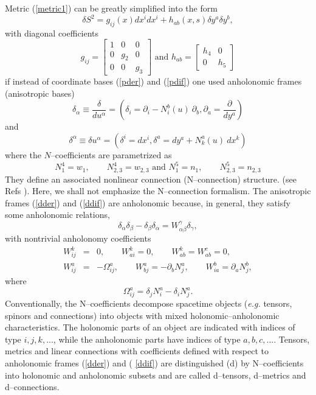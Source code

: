 \documentclass[a4paper,preprint,prabib,aps]{revtex4}
\begin{document}
Metric (\ref{metric1}) can be greatly simplified into the form
\begin{equation}
\delta S^{2}=g_{ij}\left( x\right) dx^{i}dx^{i}+h_{ab}\left( x,s\right)
\delta y^{a}\delta y^{b},  \label{dmetric}
\end{equation}
with diagonal coefficients
\begin{equation}
g_{ij}=\left[
\begin{array}{lll}
1 & 0 & 0 \\
0 & g_{2} & 0 \\
0 & 0 & g_{3}
\end{array}
\right] \mbox{ and }h_{ab}=\left[
\begin{array}{ll}
h_{4} & 0 \\
0 & h_{5}
\end{array}
\right]   \label{ansatzd}
\end{equation}
if instead of coordinate bases (\ref{pder}) and (\ref{pdif}) one used
anholonomic frames (anisotropic bases)
\begin{equation}
{\delta }_{\alpha }\equiv \frac{\delta }{du^{\alpha }}=(\delta _{i}=\partial
_{i}-N_{i}^{b}(u)\ \partial _{b},\partial _{a}=\frac{\partial }{dy^{a}})
\label{dder}
\end{equation}
and
\begin{equation}
\delta ^{\alpha }\equiv \delta u^{\alpha }=(\delta ^{i}=dx^{i},\delta
^{a}=dy^{a}+N_{k}^{a}(u)\ dx^{k})  \label{ddif}
\end{equation}
where the $N$--coefficients are parametrized as
\[
N_{1}^{4}=w_{1},\qquad N_{2,3}^{4}=w_{2,3}\mbox{ and }N_{1}^{5}=n_{1},\qquad
N_{2,3}^{5}=n_{2,3}
\]
They define an associated nonlinear connection (N--connection) structure.
(see Refs \cite{vst,v}). Here, we shall not emphasize the N--connection
formalism. The anisotropic frames (\ref{dder}) and (\ref{ddif}) are
anholonomic because, in general, they satisfy some anholonomic relations,
\[
\delta _{\alpha }\delta _{\beta }-\delta _{\beta }\delta _{\alpha
}=W_{\alpha \beta }^{\gamma }\delta _{\gamma },
\]
with nontrivial anholonomy coefficients
\begin{eqnarray}
W_{ij}^{k} &=&0,\qquad W_{ai}^{k}=0,\qquad W_{ab}^{k}=W_{ab}^{c}=0,
\label{anholonomy} \\
W_{ij}^{a} &=&-\Omega _{ij}^{a},\qquad W_{bj}^{a}=-\partial
_{b}N_{j}^{a},\qquad W_{ia}^{b}=\partial _{a}N_{j}^{b},  \nonumber
\end{eqnarray}
where
\[
\Omega _{ij}^{a}=\delta _{j}N_{i}^{a}-\delta _{i}N_{j}^{a}.
\]
Conventionally, the N--coefficients decompose spacetime objects ({\it e.g.}
tensors, spinors and connections) into objects with mixed
holonomic--anholonomic characteristics. The holonomic parts of an object are
indicated with indices of type $i,j,k,...$, while the anholonomic parts have
indices of type $a,b,c,...$. Tensors, metrics and linear connections with
coefficients defined with respect to anholonomic frames (\ref{dder}) and (%
\ref{ddif}) are distinguished (d) by N--coefficients into holonomic and
anholonomic subsets and are called d--tensors, d--metrics and d--connections.
\end{document}
